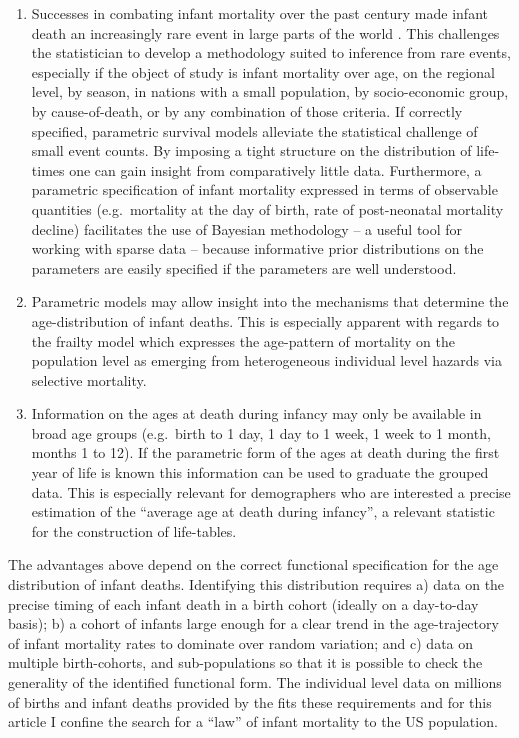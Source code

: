 \documentclass[smallextended]{svjour3} %
\begin{document}
\begin{enumerate}
\def\labelenumi{\arabic{enumi})}
\item
  Successes in combating infant mortality over the past century made
  infant death an increasingly rare event in large parts of the world
  \citep{WHO2006, WHO2015}. This challenges the statistician to develop
  a methodology suited to inference from rare events, especially if the
  object of study is infant mortality over age, on the regional level,
  by season, in nations with a small population, by socio-economic
  group, by cause-of-death, or by any combination of those criteria. If
  correctly specified, parametric survival models alleviate the
  statistical challenge of small event counts. By imposing a tight
  structure on the distribution of life-times one can gain insight from
  comparatively little data. Furthermore, a parametric specification of
  infant mortality expressed in terms of observable quantities
  (e.g.~mortality at the day of birth, rate of post-neonatal mortality
  decline) facilitates the use of Bayesian methodology -- a useful tool
  for working with sparse data -- because informative prior
  distributions on the parameters are easily specified if the parameters
  are well understood.
\item
  Parametric models may allow insight into the mechanisms that determine
  the age-distribution of infant deaths. This is especially apparent
  with regards to the frailty model \citep{Vaupel1979} which expresses
  the age-pattern of mortality on the population level as emerging from
  heterogeneous individual level hazards via selective mortality.
\item
  Information on the ages at death during infancy may only be available
  in broad age groups (e.g.~birth to 1 day, 1 day to 1 week, 1 week to 1
  month, months 1 to 12). If the parametric form of the ages at death
  during the first year of life is known this information can be used to
  graduate the grouped data. This is especially relevant for
  demographers who are interested a precise estimation of the ``average
  age at death during infancy'', a relevant statistic for the
  construction of life-tables.
\end{enumerate}

The advantages above depend on the correct functional specification for
the age distribution of infant deaths. Identifying this distribution
requires a) data on the precise timing of each infant death in a birth
cohort (ideally on a day-to-day basis); b) a cohort of infants large
enough for a clear trend in the age-trajectory of infant mortality rates
to dominate over random variation; and c) data on multiple
birth-cohorts, and sub-populations so that it is possible to check the
generality of the identified functional form. The individual level data
on millions of births and infant deaths provided by the \citet{NCHS2016}
fits these requirements and for this article I confine the search for a
``law'' of infant mortality to the US population.
\end{document}
